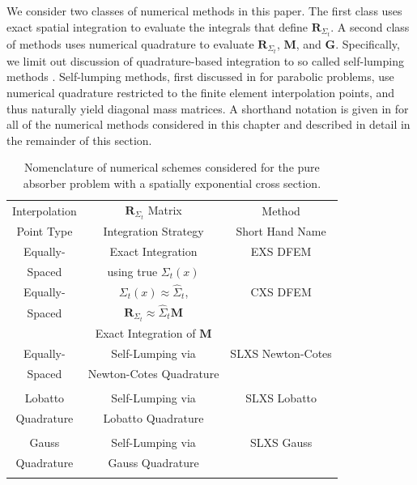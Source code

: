 We consider two classes of numerical methods in this paper.
The first class uses exact spatial integration to evaluate the integrals that define $\mathbf{R}_{\Sigma_t}$.
A second class of methods uses numerical quadrature to evaluate $\mathbf{R}_{\Sigma_t}$, $\mathbf{M}$, and $\mathbf{G}$.  
Specifically, we limit out discussion of quadrature-based integration to so called self-lumping methods \cite{part_1_paper}.  
Self-lumping methods, first discussed in \cite{raviart, thomee} for parabolic problems, use numerical quadrature restricted to the finite element interpolation points, and thus naturally yield diagonal mass matrices.  
A shorthand notation is given in  for all of the numerical methods considered in this chapter and described in detail in the remainder of this section.
\begin{table}[!htp]
\centering
\caption{Nomenclature of numerical schemes considered for the pure absorber problem with a spatially exponential cross section.}
\begin{tabular}{|c|c|c|} 
\hline
  Interpolation &   $\mathbf{R}_{\Sigma_t}$ Matrix				& 	Method					\\
  Point Type		&		Integration Strategy														& 	Short Hand Name \\
  \hline
  Equally-  & 		Exact	Integration																	& EXS DFEM \\
  Spaced   	&   using true $\Sigma_t(x)$											&             \\
  \hline
  Equally-  	& 	$\Sigma_t(x) \approx \widehat{\Sigma}_t $,																			& CXS DFEM \\
  Spaced   	&   $\mathbf{R}_{\Sigma_t} \approx \widehat{\Sigma}_t \mathbf{M}$	&             \\
										&		Exact	Integration	of $\mathbf{M}$   																									&							   \\
  \hline
  Equally-  				& Self-Lumping via  												& SLXS Newton-Cotes	 \\
  Spaced   				& Newton-Cotes Quadrature					&																				\\
  {}											&			{} 																							&     																 \\
  \hline
    Lobatto  			& 	Self-Lumping via 		& 	 	SLXS Lobatto \\
  Quadrature 	& Lobatto Quadrature	&	   \\
    {}														&		{}										& 	      \\
  \hline
  Gauss  					& Self-Lumping via  			 	& SLXS Gauss \\
  Quadrature 	& Gauss Quadrature			& 				\\
    {}									&	{}										 								&      \\
  \hline
\end{tabular}
\label{tbl:names_chap3} 
\end{table}

